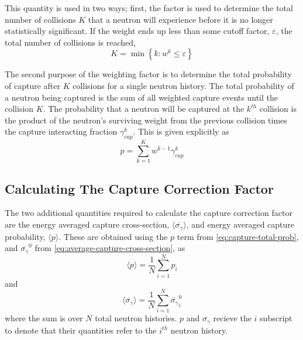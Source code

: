This quantity is used in two ways; first, the factor is used to determine the total number of collisions $K$ that a neutron will experience before it is no longer statistically significant. If the weight ends up less than some cutoff factor, $\varepsilon$, the total number of collisions is reached,
\begin{equation}
    \label{eq:collision-counter}
    K = \min{ \left\{ k : w^{k} \leq \varepsilon \right\}}
\end{equation}

The second purpose of the weighting factor is to determine the total probability of capture after $K$ collisions for a single neutron history. The total probability of a neutron being captured is the sum of all weighted capture events until the collision $K$. The probability that a neutron will be captured at the $k^{th}$ collision is the product of the neutron's surviving weight from the previous collision times the capture interacting fraction $\gamma_{cap}^{k}$. This is given explicitly as
\begin{equation}
    \label{eq:capture-total-prob}
     p = \sum_{k=1}^{K} w^{k-1}\gamma_{cap}^{k}
\end{equation}

\subsection{Calculating The Capture Correction Factor}

The two additional quantities required to calculate the capture correction factor are the energy averaged capture cross-section, $\langle \overline{\sigma_{\gamma}} \rangle$, and energy averaged capture probability, $\langle p \rangle$. These are obtained using the $p$ term from \autoref{eq:capture-total-prob}, and $\overline{\sigma_{\gamma}}^{0}$ from \autoref{eq:average-capture-cross-section}, as
\begin{equation}
    \label{eq:avg-capture-prob}
    \langle p \rangle = \frac{1}{N} \sum_{i=1}^{N} p_{i}
\end{equation}
and
\begin{equation}
    \label{eq:avg-capture-xs}
    \langle \overline{\sigma_{\gamma}} \rangle = \frac{1}{N} \sum_{i=1}^{N} \overline{\sigma_{\gamma}}^{0}_{i}
\end{equation}
where the sum is over $N$ total neutron histories. $p$ and $\overline{\sigma_{\gamma}}$ recieve the $i$ subscript to denote that their quantities refer to the $i^{th}$ neutron history.

